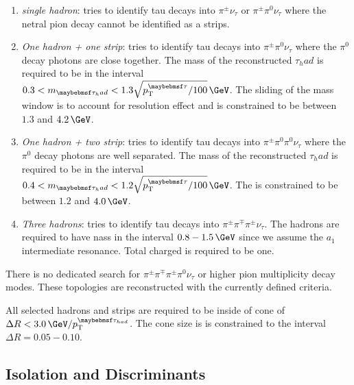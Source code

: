 \begin{enumerate}
  \item \textit{single hadron}: tries to identify tau decays into $\pi^{\pm} \nu_\tau$ or $\pi^{\pm} \pi^{0} \nu_\tau$ where the netral pion decay cannot be identified as a strips.
  \item \textit{One hadron + one strip}: tries to identify tau decays into $\pi^{\pm} \pi^{0} \nu_\tau$ where the $\pi^{0}$ decay photons are close together. The mass of the reconstructed $\tau_had$ is required to be in the interval $0.3<m_{\tau_had}<1.3\sqrt{\pt^{\tau}/100}\,\GeV$. The sliding of the mass window is to account for resolution effect and is constrained to be between $1.3$ and $4.2\,\GeV$.
  \item \textit{One hadron + two strip}: tries to identify tau decays into $\pi^{\pm} \pi^{0} \pi^{0} \nu_\tau$ where the $\pi^{0}$ decay photons are well separated. The mass of the reconstructed $\tau_had$ is required to be in the interval $0.4<m_{\tau_had}<1.2\sqrt{\pt^{\tau}/100}\,\GeV$. The is constrained to be between $1.2$ and $4.0\,\GeV$.
  \item \textit{Three hadrons}: tries to identify tau decays into $\pi^{\pm} \pi^{\mp} \pi^{\pm} \nu_\tau$. The hadrons are required to have nass in the interval $0.8-1.5\,\GeV$ since we assume the $a_{1}$ intermediate resonance. Total charged is required to be one.
\end{enumerate}

There is no dedicated search for $\pi^{\pm} \pi^{\mp} \pi^{\pm} \pi^{0} \nu_\tau$ or higher pion multiplicity decay modes. These topologies are reconstructed with the currently defined criteria.

All selected hadrons and strips are required to be inside of cone of $\Delta R < 3.0\,\GeV/\pt^{\tau_{had}}$. The cone size is is constrained to the interval $\Delta R=0.05-0.10$. 


\subsection{Isolation and Discriminants}
\label{SECTION:EventReconstructionPhysicsObjects_Taus_IsolationAndDiscriminants}


